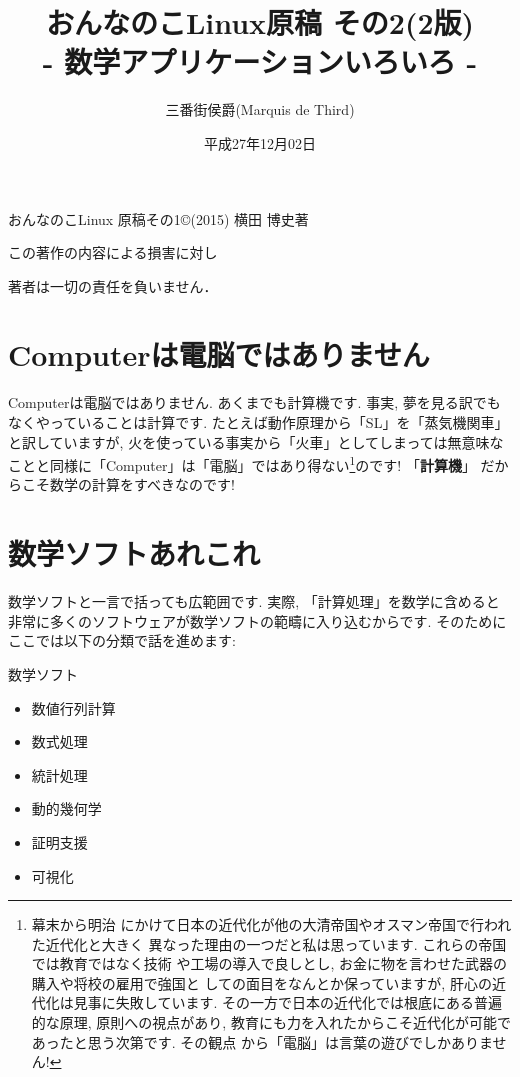 \documentclass[b5j,8pt,twocolumn]{ltjsarticle}
\title{おんなのこLinux原稿 その2(2版)\\
- 数学アプリケーションいろいろ -}
\author{三番街侯爵(Marquis de Third)}
\date{
平成27年12月02日
 }
\begin{document}
\maketitle

\vspace{10cm}

おんなのこLinux 原稿その1\copyright (2015) 横田 博史著\par

この著作の内容による損害に対し

著者は一切の責任を負いません．
\clearpage
\newpage
\setcounter{page}{1}

\section{Computerは電脳ではありません}

Computerは電脳ではありません. あくまでも計算機です. 事実, 夢を見る訳でも
なくやっていることは計算です. たとえば動作原理から「SL」を「蒸気機関車」
と訳していますが, 火を使っている事実から「火車」としてしまっては無意味な
ことと同様に「Computer」は「電脳」ではあり得ない\footnote{幕末から明治
にかけて日本の近代化が他の大清帝国やオスマン帝国で行われた近代化と大きく
異なった理由の一つだと私は思っています. これらの帝国では教育ではなく技術
や工場の導入で良しとし, お金に物を言わせた武器の購入や将校の雇用で強国と
しての面目をなんとか保っていますが, 肝心の近代化は見事に失敗しています.
 その一方で日本の近代化では根底にある普遍的な原理, 原則への視点があり,
 教育にも力を入れたからこそ近代化が可能であったと思う次第です. その観点
から「電脳」は言葉の遊びでしかありません!}のです! 「\textbf{計算機}」
だからこそ数学の計算をすべきなのです! 

\section{数学ソフトあれこれ}

数学ソフトと一言で括っても広範囲です. 実際, 「計算処理」を数学に含めると
非常に多くのソフトウェアが数学ソフトの範疇に入り込むからです. そのために
ここでは以下の分類で話を進めます:

\vspace{0.2cm}
\begin{itembox}[c]{数学ソフト}
\begin{itemize}
\item{数値行列計算}
\item{数式処理}
\item{統計処理}
\item{動的幾何学}
\item{証明支援}
\item{可視化}
\end{itemize}
\end{itembox}
\end{document}
